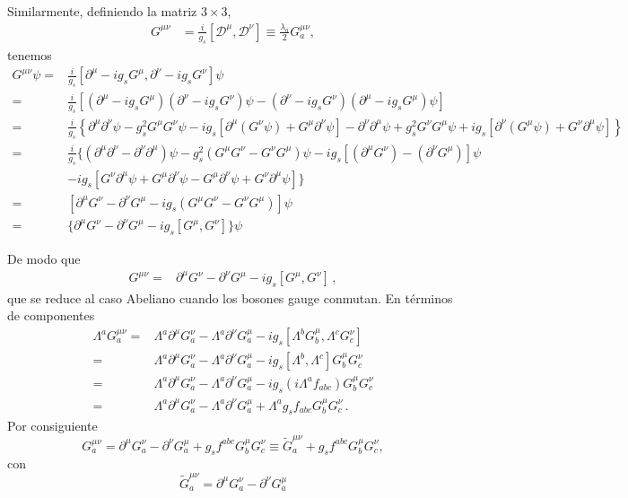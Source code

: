 Similarmente, definiendo la matriz $3\times 3$, 
\begin{align}
  \label{eq:gmunu}
  {{G}}^{\mu\nu}&=\frac{i}{g_s}[\mathcal{D}^\mu,\mathcal{D}^\nu]\equiv\frac{\lambda_a}{2}G^{\mu\nu}_a,
\end{align}
tenemos
\begin{align}
  \label{eq:164qft}
   {G}^{\mu\nu}\psi =&\frac{i}{g_s}[\partial^\mu-ig_sG^\mu,\partial^\nu-ig_sG^\nu]\psi\nonumber\\
  =&\frac{i}{g_s}\left[\left(\partial^\mu-ig_sG^\mu\right)\left(\partial^\nu-ig_sG^\nu\right)\psi
    -\left(\partial^\nu-ig_sG^\nu\right)\left(\partial^\mu-ig_sG^\mu\right)\psi\right]\nonumber\\
  =&\frac{i}{g_s}\left\{\partial^\mu\partial^\nu\psi-g_s^2G^\mu G^\nu\psi-ig_s[\partial^\mu(G^\nu\psi)+G^\mu\partial^\nu\psi]
    -\partial^\nu\partial^\mu\psi+g_s^2G^\nu G^\mu\psi+ig_s[\partial^\nu(G^\mu\psi)+G^\nu\partial^\mu\psi]\right\}\nonumber\\
  =&\frac{i}{g_s}\{(\partial^\mu\partial^\nu-\partial^\nu\partial^\mu)\psi-g_s^2(G^\mu G^\nu-G^\nu G^\mu)\psi
  -ig_s[(\partial^\mu G^\nu)-(\partial^\nu G^\mu)]\psi\nonumber\\
  &-ig_s[G^\nu\partial^\mu\psi+G^\mu\partial^\nu\psi-G^\mu\partial^\nu\psi+G^\nu\partial^\mu\psi]\}\nonumber\\
=&[\partial^\mu G^\nu-\partial^\nu G^\mu-ig_s(G^\mu G^\nu-G^\nu G^\mu)]\psi\nonumber\\
=&\{\partial^\mu G^\nu-\partial^\nu G^\mu-ig_s[G^\mu,G^\nu]\}\psi
\end{align}

De modo que
\begin{align}
  {G}^{\mu\nu}=&\partial^\mu G^\nu-\partial^\nu G^\mu-ig_s[G^\mu,G^\nu]\,,
\end{align}
que se reduce al caso Abeliano cuando los bosones gauge conmutan. En términos de componentes
\begin{align}
  \Lambda^a{G}^{\mu\nu}_a=&\Lambda^a\partial^\mu G^\nu_a-\Lambda^a\partial^\nu G^\mu_a-ig_s[\Lambda^bG^\mu_b,\Lambda^cG^\nu_c]\nonumber\\
  =&\Lambda^a\partial^\mu G^\nu_a-\Lambda^a\partial^\nu G^\mu_a-ig_s[\Lambda^b,\Lambda^c]G^\mu_bG^\nu_c\nonumber\\
  =&\Lambda^a\partial^\mu G^\nu_a-\Lambda^a\partial^\nu G^\mu_a-ig_s(i\Lambda^af_{a b c})G^\mu_bG^\nu_c\nonumber\\
  =&\Lambda^a\partial^\mu G^\nu_a-\Lambda^a\partial^\nu G^\mu_a+\Lambda^ag_sf_{a b c}G^\mu_bG^\nu_c\,.
\end{align}
Por consiguiente
\begin{equation}
  \label{eq:258qft}
  G^{\mu\nu}_a=\partial^\mu G^\nu_a-\partial^\nu G^\mu_a+g_s f^{abc}G^\mu_b G^\nu_c\equiv\widetilde{G}^{\mu\nu}_a+g_s f^{abc}G^\mu_b G^\nu_c,
\end{equation}
con
\begin{equation}
  \widetilde{G}^{\mu\nu}_a=\partial^\mu G^\nu_a-\partial^\nu G^\mu_a
\end{equation}



